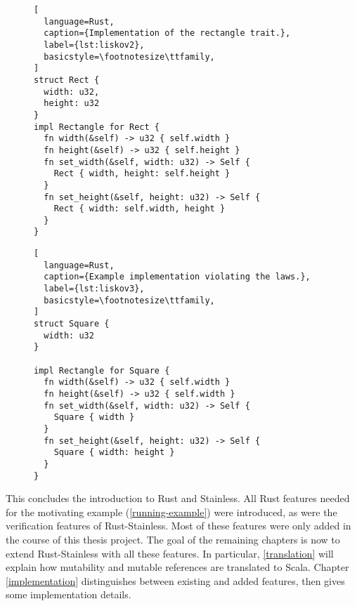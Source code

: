\begin{figure}[hbt]
\noindent \begin{minipage}[t]{.49\textwidth}
\begin{lstlisting}[
  language=Rust,
  caption={Implementation of the rectangle trait.},
  label={lst:liskov2},
  basicstyle=\footnotesize\ttfamily,
]
struct Rect {
  width: u32,
  height: u32
}
impl Rectangle for Rect {
  fn width(&self) -> u32 { self.width }
  fn height(&self) -> u32 { self.height }
  fn set_width(&self, width: u32) -> Self {
    Rect { width, height: self.height }
  }
  fn set_height(&self, height: u32) -> Self {
    Rect { width: self.width, height }
  }
}
\end{lstlisting}
\end{minipage}\hfill
\begin{minipage}[t]{.49\textwidth}
\begin{lstlisting}[
  language=Rust,
  caption={Example implementation violating the laws.},
  label={lst:liskov3},
  basicstyle=\footnotesize\ttfamily,
]
struct Square {
  width: u32
}

impl Rectangle for Square {
  fn width(&self) -> u32 { self.width }
  fn height(&self) -> u32 { self.width }
  fn set_width(&self, width: u32) -> Self {
    Square { width }
  }
  fn set_height(&self, height: u32) -> Self {
    Square { width: height }
  }
}
\end{lstlisting}
\end{minipage}
\end{figure}

\noindent This concludes the introduction to Rust and Stainless. All Rust
features needed for the motivating example (\autoref{running-example}) were
introduced, as were the verification features of Rust-Stainless.  Most of these
features were only added in the course of this thesis project. The goal of the
remaining chapters is now to extend Rust-Stainless with all these features. In
particular, \autoref{translation} will explain how mutability and mutable
references are translated to Scala. Chapter \ref{implementation} distinguishes
between existing and added features, then gives some implementation details.


